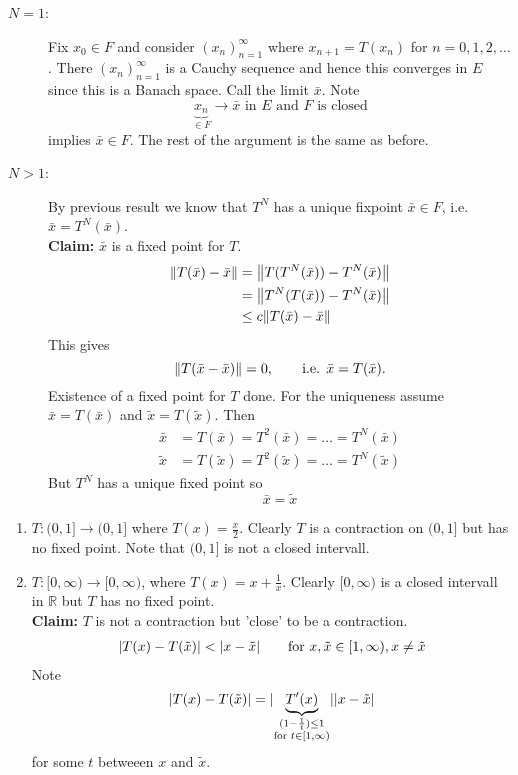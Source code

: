 \begin{beweis}
	\begin{description}
		\item[$N=1$:] Fix $x_0 \in F$ and consider $(x_n)_{n=1}^{\infty}$ where $x_{n+1} = T(x_n)$ for $n=0,1,2, \dots$. There $(x_n)_{n=1}^{\infty}$ is a Cauchy sequence and hence this converges in $E$ since this is a Banach space. Call the limit $\bar{x}$. Note
		\[
			\underset{\in F}{\underbrace{x_n}} \to \bar{x} \text{ in }E \text{ and $F$ is closed}
		\] 
		implies $\bar{x} \in F$. The rest of the argument is the same as before.
		\item[$N>1$:] By previous result we know that $T^N$ has a unique fixpoint $\bar{x} \in F$, i.e. $\bar{x} = T^N(\bar{x})$. \\
		\textbf{Claim:} \text{    }     $\bar{x}$ is a fixed point for $T$.
		\begin{align*}
			\norm{T(\bar{x})-\bar{x}} &= \norm{T(T^N(\bar{x}))- T^N(\bar{x})} \\
			&= \norm{T^N(T(\bar{x}))- T^N(\bar{x})} \\
			&\leq c \norm{T(\bar{x})-\bar{x}}
 		\end{align*}
		This gives 
		\[
			\norm{T(\bar{x}-\bar{x})} = 0, \qquad \text{i.e. }\bar{x} = T(\bar{x}).
		\]
		Existence of a fixed point for $T$ done. For the uniqueness assume $\bar{x} = T(\bar{x})$ and $\tilde x = T( \tilde x)$. Then
	\begin{align*}
		\bar{x} &= T( \bar{x}) = T^2(\bar{x}) = \dots = T^N(\bar{x}) \\
		\tilde x &= T(\tilde x) = T^2(\tilde x) = \dots = T^N(\tilde x)
	\end{align*}
	But $T^N$ has a unique fixed point so 
	\[
		\bar{x} = \tilde x
	\]
	\end{description}
\end{beweis}
\begin{bemerkung}
	\begin{enumerate}[(1)]
		\item $T: (0,1] \to (0,1]$ where $T(x) = \frac{x}{2}$. Clearly $T$ is a contraction on $(0,1]$ but has no fixed point. Note that $(0,1]$ is not a closed intervall. 
		\item $T: [0,\infty) \to [0,\infty)$, where $T(x) = x + \frac{1}{x}$. Clearly $[0,\infty)$ is a closed intervall in $\mathbb{R}$ but $T$ has no fixed point. \\
		\textbf{Claim:} \text{    }     $T$ is not a contraction but 'close' to be a contraction. \\
		\begin{align*}
			\lvert T(x)-T(\tilde x)\rvert < \lvert x- \tilde x\rvert \qquad \text{for }x, \tilde x \in [1, \infty), x \neq \tilde x
		\end{align*}
		Note \[
			\lvert T(x)- T( \tilde x)\rvert = \lvert\underset{\substack{(1- \frac{1}{t})\leq 1 \\ \text{for }t \in [1,\infty)}}{\underbrace{T'(x)}}\rvert\lvert x- \tilde x\rvert
		\] for some $t$ betweeen $x$ and $\tilde x$.
	\end{enumerate}
\end{bemerkung}
